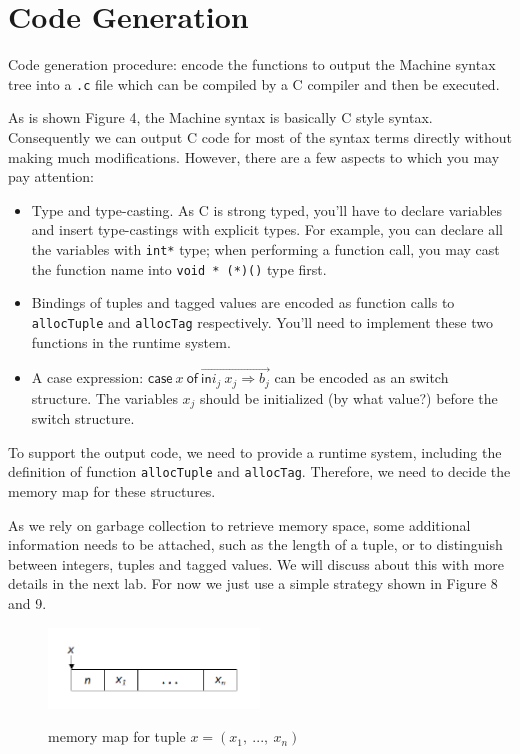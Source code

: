 \documentclass{article}
\theoremstyle{definition}
\theoremstyle{remark}
\numberwithin{equation}{section}
\begin{document}
\section{Code Generation}

Code generation procedure: encode the functions to output the
Machine syntax tree into a \texttt{.c} file which can be compiled by
a C compiler and then be executed.

As is shown Figure 4, the Machine syntax is basically C style syntax.
Consequently we can output C code for most of the syntax terms directly without making
much modifications. However, there are a few aspects to which you may pay attention:

\begin{itemize}
  \item Type and type-casting. As C is strong typed, you'll have to declare
  variables and insert type-castings with explicit types. For example, you can
  declare all the variables with \texttt{int*} type; when performing a
  function call, you may cast the function name into \texttt{void * (*)()} type first.
  \item Bindings of tuples and tagged values are encoded as function calls to
  \texttt{allocTuple} and \texttt{allocTag} respectively. You'll need to implement
  these two functions in the runtime system.
  \item A case expression: $\textsf{case}\ x\ \textsf{of}
         \ \overrightarrow{\textsf{in}i_j\ x_j \Rightarrow b_j}$ can be encoded as an
  switch structure. The variables
  $x_j$ should be initialized (by what value?) before the switch structure.
\end{itemize}

To support the output code, we need to provide a runtime system, including the definition
 of function \texttt{allocTuple} and \texttt{allocTag}. Therefore, we need to decide
the memory map for these structures.

As we rely on garbage
collection to retrieve memory space, some additional information needs to be attached,
 such as the length of a tuple, or to distinguish between integers, tuples and tagged
 values. We will discuss about this with more details in
the next lab. For now we just use a simple strategy shown in Figure 8 and 9.

\begin{figure}
  \centering
  \includegraphics[width=0.5\textwidth]{tuple.png}\\
  \caption{memory map for tuple $x=(x_1,\ ...,\ x_n)$}\label{fig:digit}
\end{figure}
\end{document}

